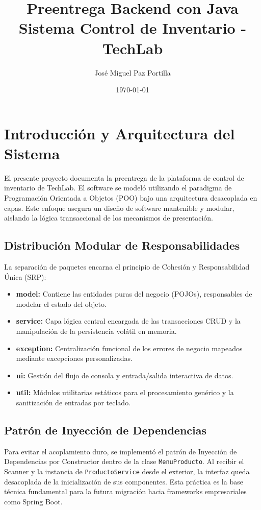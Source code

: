 \documentclass[12pt,a4paper]{article}
\title{Preentrega Backend con Java \\ \large Sistema Control de Inventario - TechLab}
\author{José Miguel Paz Portilla}
\date{\today}
\begin{document}
\maketitle
\newpage
\tableofcontents
\newpage

\section{Introducción y Arquitectura del Sistema}
El presente proyecto documenta la preentrega de la plataforma de control de inventario de TechLab. El software se modeló utilizando el paradigma de Programación Orientada a Objetos (POO) bajo una arquitectura desacoplada en capas. Este enfoque asegura un diseño de software mantenible y modular, aislando la lógica transaccional de los mecanismos de presentación.

\subsection{Distribución Modular de Responsabilidades}
La separación de paquetes encarna el principio de Cohesión y Responsabilidad Única (SRP):
\begin{itemize}
    \item \textbf{model:} Contiene las entidades puras del negocio (POJOs), responsables de modelar el estado del objeto.
    \item \textbf{service:} Capa lógica central encargada de las transacciones CRUD y la manipulación de la persistencia volátil en memoria.
    \item \textbf{exception:} Centralización funcional de los errores de negocio mapeados mediante excepciones personalizadas.
    \item \textbf{ui:} Gestión del flujo de consola y entrada/salida interactiva de datos.
    \item \textbf{util:} Módulos utilitarias estáticos para el procesamiento genérico y la sanitización de entradas por teclado.
\end{itemize}

\subsection{Patrón de Inyección de Dependencias}
Para evitar el acoplamiento duro, se implementó el patrón de Inyección de Dependencias por Constructor dentro de la clase \texttt{MenuProducto}. Al recibir el Scanner y la instancia de \texttt{ProductoService} desde el exterior, la interfaz queda desacoplada de la inicialización de sus componentes. Esta práctica es la base técnica fundamental para la futura migración hacia frameworks empresariales como Spring Boot.
\end{document}
